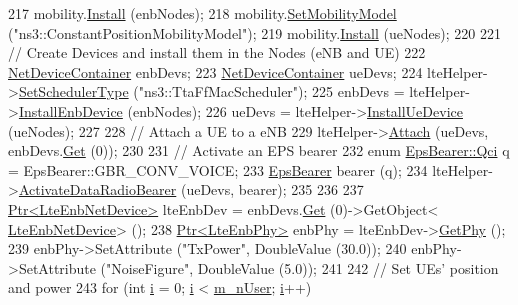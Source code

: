 \begin{DoxyCode}
217   mobility.\hyperlink{classns3_1_1MobilityHelper_a07737960ee95c0777109cf2994dd97ae}{Install} (enbNodes);
218   mobility.\hyperlink{classns3_1_1MobilityHelper_a030275011b6f40682e70534d30280aba}{SetMobilityModel} (\textcolor{stringliteral}{"ns3::ConstantPositionMobilityModel"});
219   mobility.\hyperlink{classns3_1_1MobilityHelper_a07737960ee95c0777109cf2994dd97ae}{Install} (ueNodes);
220 
221   \textcolor{comment}{// Create Devices and install them in the Nodes (eNB and UE)}
222   \hyperlink{classns3_1_1NetDeviceContainer}{NetDeviceContainer} enbDevs;
223   \hyperlink{classns3_1_1NetDeviceContainer}{NetDeviceContainer} ueDevs;
224   lteHelper->\hyperlink{classns3_1_1LteHelper_a8f86e55b8b80a81732c4b2df00fb25d5}{SetSchedulerType} (\textcolor{stringliteral}{"ns3::TtaFfMacScheduler"});
225   enbDevs = lteHelper->\hyperlink{classns3_1_1LteHelper_a5e009ad35ef85f46b5a6099263f15a03}{InstallEnbDevice} (enbNodes);
226   ueDevs = lteHelper->\hyperlink{classns3_1_1LteHelper_ac9cd932d7de92811cfa953c2e3b2fc9f}{InstallUeDevice} (ueNodes);
227 
228   \textcolor{comment}{// Attach a UE to a eNB}
229   lteHelper->\hyperlink{classns3_1_1LteHelper_a9466743f826aa2652a87907b7f0a1c87}{Attach} (ueDevs, enbDevs.\hyperlink{classns3_1_1NetDeviceContainer_a677d62594b5c9d2dea155cc5045f4d0b}{Get} (0));
230 
231   \textcolor{comment}{// Activate an EPS bearer}
232   \textcolor{keyword}{enum} \hyperlink{structns3_1_1EpsBearer_aecf0c67109c5eb4ec0b07226fff5885e}{EpsBearer::Qci} q = EpsBearer::GBR\_CONV\_VOICE;
233   \hyperlink{structns3_1_1EpsBearer}{EpsBearer} bearer (q);
234   lteHelper->\hyperlink{classns3_1_1LteHelper_ac896e16cf162e4beeaa292d39ab1b700}{ActivateDataRadioBearer} (ueDevs, bearer);
235   
236  
237   \hyperlink{classns3_1_1Ptr}{Ptr<LteEnbNetDevice>} lteEnbDev = enbDevs.\hyperlink{classns3_1_1NetDeviceContainer_a677d62594b5c9d2dea155cc5045f4d0b}{Get} (0)->GetObject<
      \hyperlink{classns3_1_1LteEnbNetDevice}{LteEnbNetDevice}> ();
238   \hyperlink{classns3_1_1Ptr}{Ptr<LteEnbPhy>} enbPhy = lteEnbDev->\hyperlink{classns3_1_1LteEnbNetDevice_a58db72130e0740f16a5e03b22e4a10a4}{GetPhy} ();
239   enbPhy->SetAttribute (\textcolor{stringliteral}{"TxPower"}, DoubleValue (30.0));
240   enbPhy->SetAttribute (\textcolor{stringliteral}{"NoiseFigure"}, DoubleValue (5.0));
241 
242   \textcolor{comment}{// Set UEs' position and power}
243   \textcolor{keywordflow}{for} (\textcolor{keywordtype}{int} \hyperlink{bernuolliDistribution_8m_a6f6ccfcf58b31cb6412107d9d5281426}{i} = 0; \hyperlink{bernuolliDistribution_8m_a6f6ccfcf58b31cb6412107d9d5281426}{i} < \hyperlink{classLenaTtaFfMacSchedulerTestCase_a62553f6f986f9e498a77482da9e649c5}{m\_nUser}; \hyperlink{bernuolliDistribution_8m_a6f6ccfcf58b31cb6412107d9d5281426}{i}++)

\end{DoxyCode}
